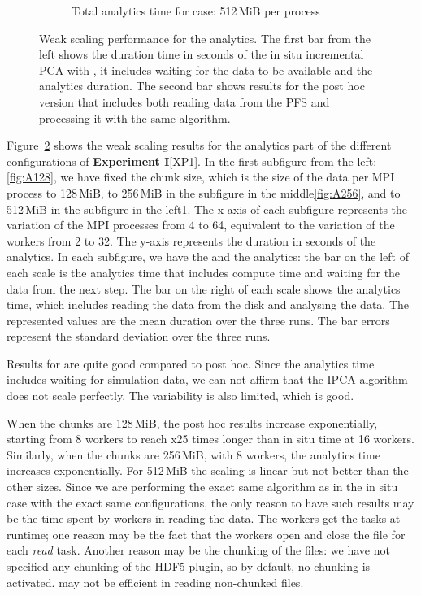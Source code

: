 \begin{figure}
\begin{subfigure}[b]{0.3\textwidth}
         \caption{Total analytics time for case: 512\,MiB per process}
         \label{fig:A512}
     \end{subfigure}
        \caption{Weak scaling performance for the analytics. The first bar from the left shows the duration time in seconds of the in situ incremental PCA with \deisa, it includes waiting for the data to be available and the analytics duration. The second bar shows results for the post hoc version that includes both reading data from the PFS and processing it with the same algorithm.}
        \label{fig:perfA1}
\end{figure}

Figure~\ref{fig:perfA1} shows the weak scaling results for the analytics part of the different configurations of \textbf{Experiment I}\ref{XP1}. In the first subfigure from the left: \ref{fig:A128}, we have fixed the chunk size, which is the size of the data per MPI process to 128\,MiB, to 256\,MiB in the subfigure in the middle\ref{fig:A256}, and to 512\,MiB in the subfigure in the left\ref{fig:A512}. The x-axis of each subfigure represents the variation of the MPI processes from 4 to 64, equivalent to the variation of the \dask workers from 2 to 32. The y-axis represents the duration in seconds of the analytics. 
In each subfigure, we have the \deisa and the \dask analytics: the bar on the left of each scale is the \deisa analytics time that includes compute time and waiting for the data from the next step. The bar on the right of each scale shows the analytics time,  which includes reading the data from the disk and analysing the data. 
The represented values are the mean duration over the three runs. The bar errors represent the standard deviation over the three runs.       

Results for \deisa are quite good compared to post hoc. Since the analytics time includes waiting for simulation data, we can not affirm that the IPCA algorithm does not scale perfectly. The variability is also limited, which is good.

When the chunks are 128\,MiB, the post hoc results increase exponentially, starting from 8 workers to reach x25 times longer than in situ time at 16 workers. Similarly, when the chunks are 256\,MiB, with 8 workers, the analytics time increases exponentially. For 512\,MiB the scaling is linear but not better than the other sizes.
Since we are performing the exact same algorithm as in the in situ case with the exact same configurations, the only reason to have such results may be the time spent by \dask workers in reading the data. The \dask workers get the tasks at runtime; one reason may be the fact that the workers open and close the file for each \textit{read} task. 
Another reason may be the chunking of the files: we have not specified any chunking of the \pdi HDF5 plugin, so by default, no chunking is activated\cite{noauthor_pdidev_2022}. \dask may not be efficient in reading non-chunked files. 

